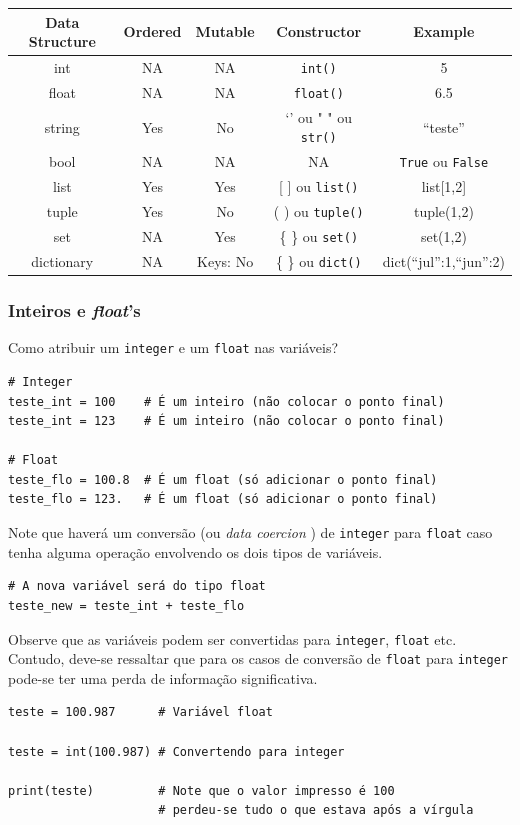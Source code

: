 \documentclass[]{book}
\begin{document}
\begin{longtable}[]{@{}ccccc@{}}
\toprule
Data Structure & Ordered & Mutable & Constructor &
Example\tabularnewline
\midrule
\endhead
int & NA & NA & \texttt{int()} & 5\tabularnewline
float & NA & NA & \texttt{float()} & 6.5\tabularnewline
string & Yes & No & `' ou " " ou \texttt{str()} &
``teste''\tabularnewline
bool & NA & NA & NA & \texttt{True} ou \texttt{False}\tabularnewline
list & Yes & Yes & {[} {]} ou \texttt{list()} &
list{[}1,2{]}\tabularnewline
tuple & Yes & No & ( ) ou \texttt{tuple()} & tuple(1,2)\tabularnewline
set & NA & Yes & \{ \} ou \texttt{set()} & set(1,2)\tabularnewline
dictionary & NA & Keys: No & \{ \} ou \texttt{dict()} &
dict(``jul'':1,``jun'':2)\tabularnewline
\bottomrule
\end{longtable}

\subsubsection{\texorpdfstring{Inteiros e
\emph{float}'s}{Inteiros e float's}}\label{inteiros-e-floats}

Como atribuir um \texttt{integer} e um \texttt{float} nas variáveis?

\begin{verbatim}
# Integer
teste_int = 100    # É um inteiro (não colocar o ponto final)
teste_int = 123    # É um inteiro (não colocar o ponto final)

# Float
teste_flo = 100.8  # É um float (só adicionar o ponto final)
teste_flo = 123.   # É um float (só adicionar o ponto final)
\end{verbatim}

Note que haverá um conversão (ou \emph{data coercion} ) de
\texttt{integer} para \texttt{float} caso tenha alguma operação
envolvendo os dois tipos de variáveis.

\begin{verbatim}
# A nova variável será do tipo float
teste_new = teste_int + teste_flo
\end{verbatim}

Observe que as variáveis podem ser convertidas para \texttt{integer},
\texttt{float} etc. Contudo, deve-se ressaltar que para os casos de
conversão de \texttt{float} para \texttt{integer} pode-se ter uma perda
de informação significativa.

\begin{verbatim}
teste = 100.987      # Variável float

teste = int(100.987) # Convertendo para integer

print(teste)         # Note que o valor impresso é 100
                     # perdeu-se tudo o que estava após a vírgula
\end{verbatim}
\end{document}
